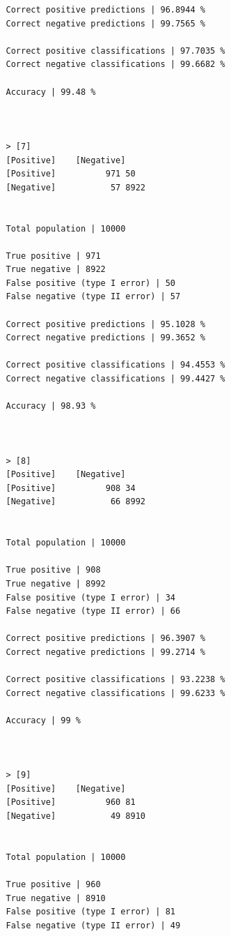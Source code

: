 \documentclass{classrep}
\begin{document}
{{{\begin{lstlisting}
                Correct positive predictions | 96.8944 %
                Correct negative predictions | 99.7565 %

                Correct positive classifications | 97.7035 %
                Correct negative classifications | 99.6682 %

                Accuracy | 99.48 %



                > [7]
                [Positive]    [Negative]
                [Positive]          971 50
                [Negative]           57 8922


                Total population | 10000

                True positive | 971
                True negative | 8922
                False positive (type I error) | 50
                False negative (type II error) | 57

                Correct positive predictions | 95.1028 %
                Correct negative predictions | 99.3652 %

                Correct positive classifications | 94.4553 %
                Correct negative classifications | 99.4427 %

                Accuracy | 98.93 %



                > [8]
                [Positive]    [Negative]
                [Positive]          908 34
                [Negative]           66 8992


                Total population | 10000

                True positive | 908
                True negative | 8992
                False positive (type I error) | 34
                False negative (type II error) | 66

                Correct positive predictions | 96.3907 %
                Correct negative predictions | 99.2714 %

                Correct positive classifications | 93.2238 %
                Correct negative classifications | 99.6233 %

                Accuracy | 99 %



                > [9]
                [Positive]    [Negative]
                [Positive]          960 81
                [Negative]           49 8910


                Total population | 10000

                True positive | 960
                True negative | 8910
                False positive (type I error) | 81
                False negative (type II error) | 49


\end{lstlisting}}}}
\end{document}
